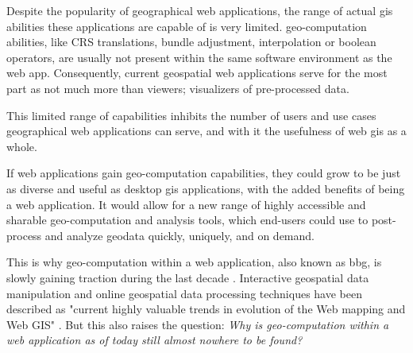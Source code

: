 Despite the popularity of geographical web applications, the range of actual \ac{gis} abilities these applications are capable of is very limited. \ac{geo-computation} abilities, like CRS translations, bundle adjustment, interpolation or boolean operators, are usually not present within the same software environment as the web app. Consequently, current geospatial web applications serve for the most part as not much more than viewers; visualizers of pre-processed data. 

This limited range of capabilities inhibits the number of users and use cases geographical web applications can serve, and with it the usefulness of web \ac{gis} as a whole.

If web applications gain \ac{geo-computation} capabilities, they could grow to be just as diverse and useful as desktop \ac{gis} applications, with the added benefits of being a web application. It would allow for a new range of highly accessible and sharable geo-computation and analysis tools, which end-users could use to post-process and analyze geodata quickly, uniquely, and on demand.

This is why \ac{geo-computation} within a web application, also known as \ac{bbg}, is slowly gaining traction during the last decade \cite{kulawiak_analysis_2019, panidi_hybrid_2015, hamilton_client-side_2014}. 
Interactive geospatial data manipulation and online geospatial data processing techniques have been described as "current highly valuable trends in evolution of the Web mapping and Web GIS" \cite{panidi_hybrid_2015}. 
But this also raises the question: \textit{Why is geo-computation within a web application as of today still almost nowhere to be found?} 




